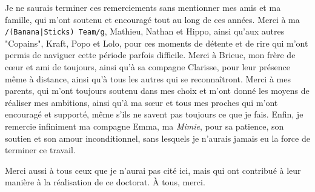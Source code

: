 Je ne saurais terminer ces remerciements sans mentionner mes amis et ma famille, qui m'ont soutenu et encouragé tout au long de ces années.
Merci à ma \texttt{/(Banana|Sticks) Team/g}, Mathieu, Nathan et Hippo, ainsi qu'aux autres "Copains", Kraft, Popo et Lolo, pour ces moments de détente et de rire qui m'ont permis de naviguer cette période parfois difficile.
Merci à Brieuc, mon frère de c{\oe}ur et ami de toujours, ainsi qu'à sa compagne Clarisse, pour leur présence même à distance, ainsi qu'à tous les autres qui se reconnaîtront.
Merci à mes parents, qui m'ont toujours soutenu dans mes choix et m'ont donné les moyens de réaliser mes ambitions, ainsi qu'à ma s{\oe}ur et tous mes proches qui m'ont encouragé et supporté, même s'ils ne savent pas toujours ce que je fais.
Enfin, je remercie infiniment ma compagne Emma, ma \emph{Mimie}, pour sa patience, son soutien et son amour inconditionnel, sans lesquels je n'aurais jamais eu la force de terminer ce travail.

Merci aussi à tous ceux que je n'aurai pas cité ici, mais qui ont contribué à leur manière à la réalisation de ce doctorat.
À tous, merci.







